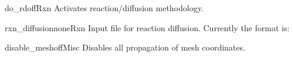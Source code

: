 
\begin{optionSummary}{do\_rd}{off}{Rxn}
Activates reaction/diffusion methodology.
\end{optionSummary}
\begin{optionSummary}{rxn\_diffusion}{none}{Rxn}
Input file for reaction diffusion.
Currently the format is:\par
{}
\end{optionSummary}


\begin{optionSummary}{disable\_mesh}{off}{Misc}
Disables all propagation of mesh coordinates.
\end{optionSummary}

